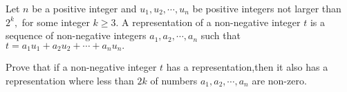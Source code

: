 Let $n$ be a positive integer and $u_1,u_2,\cdots ,u_n$ be positive integers not larger than $2^k, $ for some  integer  $k\geq 3.$ A representation of  a non-negative  integer $t$ is a sequence of  non-negative  integers $a_1,a_2,\cdots ,a_n$ such that $t=a_1u_1+a_2u_2+\cdots +a_nu_n.$

Prove that if a non-negative  integer $t$  has a representation,then it also has a  representation  where less than $2k$ of numbers $a_1,a_2,\cdots ,a_n$ are non-zero.